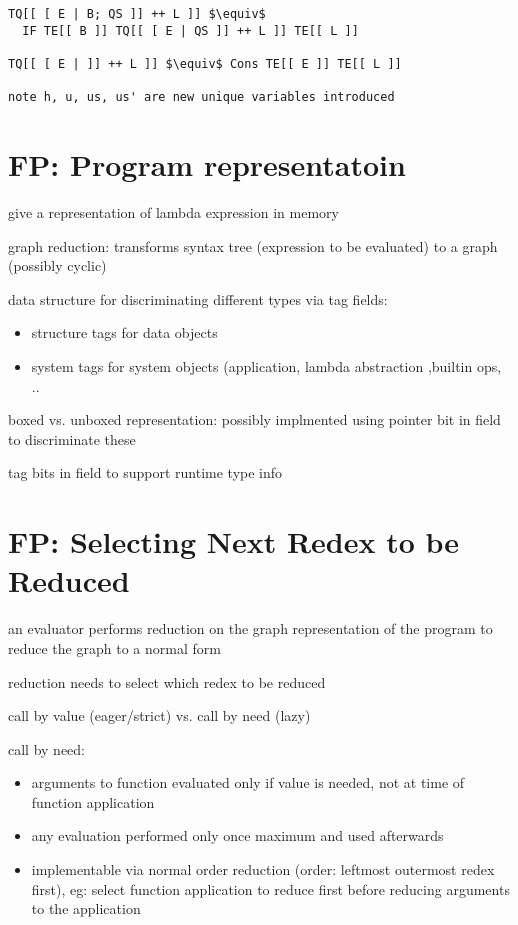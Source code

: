 \documentclass[8pt]{extarticle}
\begin{document}
\begin{multicols*}{2}
\begin{lstlisting}
TQ[[ [ E | B; QS ]] ++ L ]] $\equiv$
  IF TE[[ B ]] TQ[[ [ E | QS ]] ++ L ]] TE[[ L ]]

TQ[[ [ E | ]] ++ L ]] $\equiv$ Cons TE[[ E ]] TE[[ L ]]

note h, u, us, us' are new unique variables introduced
\end{lstlisting}

\section{FP: Program representatoin}

give a representation of lambda expression in memory

graph reduction: transforms syntax tree (expression to be evaluated) to a graph (possibly cyclic)

data structure for discriminating different types via tag fields:
\begin{itemize}
\item structure tags for data objects
\item system tags for system objects (application, lambda abstraction ,builtin ops, ..
\end{itemize}

boxed vs. unboxed representation: possibly implmented using pointer bit in field to discriminate these

tag bits in field to support runtime type info

\section{FP: Selecting Next Redex to be Reduced}

an evaluator performs reduction on the graph representation of the program to reduce the graph to a normal form

reduction needs to select which redex to be reduced

call by value (eager/strict) vs. call by need (lazy)

call by need:
\begin{itemize}
\item arguments to function evaluated only if value is needed, not at time of function application
\item any evaluation performed only once maximum and used afterwards
\item implementable via normal order reduction (order: leftmost outermost redex first), eg: select function application to reduce first before reducing arguments to the application
\end{itemize}


\end{multicols*}
\end{document}
